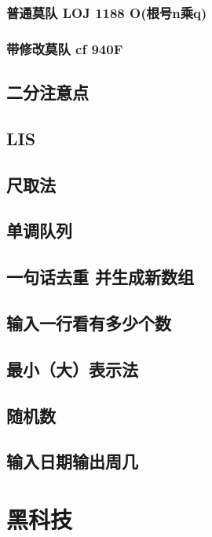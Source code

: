 \documentclass[10pt,a4paper]{article}
\begin{document}
\subsubsection{普通莫队 LOJ 1188 O(根号n乘q)}

\subsubsection{带修改莫队 cf 940F}

\subsection{二分注意点}

\subsection{LIS}

\subsection{尺取法}

\subsection{单调队列}

\subsection{一句话去重 并生成新数组}

\subsection{输入一行看有多少个数}

\subsection{最小（大）表示法}

\subsection{随机数}

\subsection{输入日期输出周几}

\section{黑科技}
\end{document}
